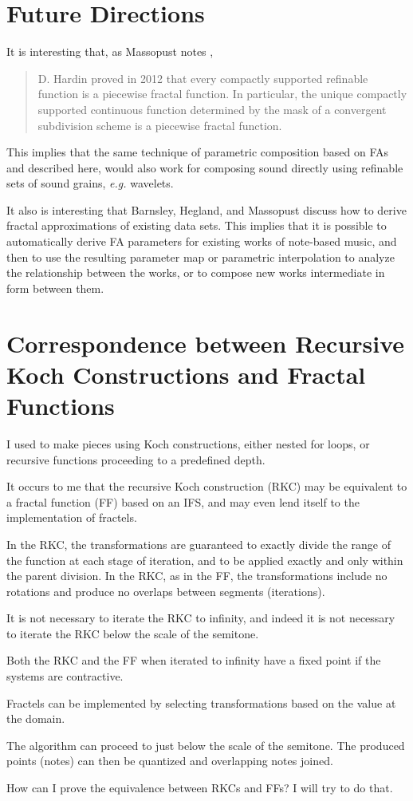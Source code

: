\documentclass[english,11pt,letterpaper,onecolumn]{scrartcl}
\numberwithin{equation}{section}
\begin{document}
\section{Future Directions}

It is interesting that, as Massopust notes \cite{massopust2017},
\begin{quote}D. Hardin proved in 2012 that every compactly supported
refinable function is a piecewise fractal function. In particular, the
unique
compactly supported continuous function determined by the mask of a
convergent
subdivision scheme is a piecewise fractal function. \end{quote}
This implies that the same technique of parametric
composition based on FAs and described here, would also work for composing
sound directly using refinable sets of sound grains, \textit{e.g.}
wavelets.

It also is interesting that Barnsley, Hegland, and Massopust
\cite{2013arXiv1309.0972B} discuss how to derive fractal approximations of
existing data sets. This implies that it is possible to automatically
derive
FA parameters for existing works of note-based music, and then to use the
resulting parameter map or parametric interpolation to analyze the
relationship between the works, or to compose new works intermediate in
form
between them.

\section{Correspondence between Recursive Koch Constructions and Fractal Functions}

I used to make pieces using Koch constructions, either nested for loops, or recursive
functions proceeding to a predefined depth.

It occurs to me that the recursive Koch construction (RKC) may be equivalent to a
fractal function (FF) based on an IFS, and may even lend itself to the implementation
of fractels.

In the RKC, the transformations are guaranteed to exactly divide the range of the
function at each stage of iteration, and to be applied exactly and only within the
parent division. In the RKC, as in the FF, the transformations include no rotations and
produce no overlaps between segments (iterations).

It is not necessary to iterate the RKC to infinity, and indeed it is not necessary to
iterate the RKC below the scale of the semitone.

Both the RKC and the FF when iterated to infinity have a fixed point if the systems are
contractive.

Fractels can be implemented by selecting transformations based on the value at the domain.

The algorithm can proceed to just below the scale of the semitone. The produced points
(notes) can then be quantized and overlapping notes joined.

How can I prove the equivalence between RKCs and FFs? I will try to do that.

\printbibliography
\end{document}
